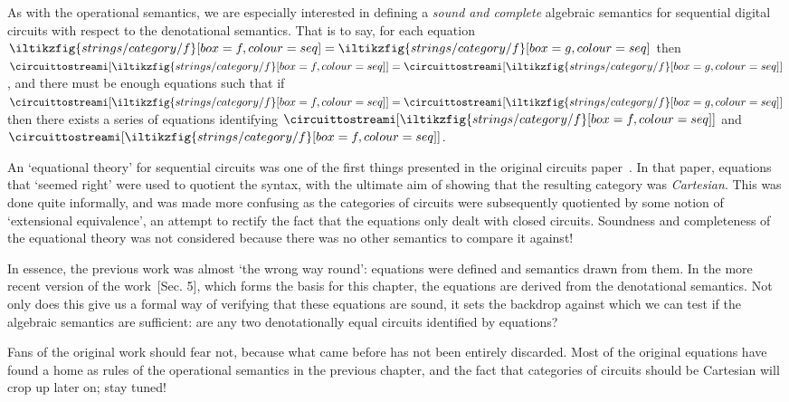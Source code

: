 As with the operational semantics, we are especially interested in defining a
\emph{sound and complete} algebraic semantics for sequential digital circuits
with respect to the denotational semantics.
That is to say, for each equation \(
    \iltikzfig{strings/category/f}[box=f,colour=seq]
    =
    \iltikzfig{strings/category/f}[box=g,colour=seq]
\) then \(
    \circuittostreami[\iltikzfig{strings/category/f}[box=f,colour=seq]]
    =
    \circuittostreami[\iltikzfig{strings/category/f}[box=g,colour=seq]]
\), and there must be enough equations such that if \(
    \circuittostreami[\iltikzfig{strings/category/f}[box=f,colour=seq]]
    =
    \circuittostreami[\iltikzfig{strings/category/f}[box=g,colour=seq]]
\) then there exists a series of equations identifying \(
    \circuittostreami[\iltikzfig{strings/category/f}[box=f,colour=seq]]
\) and \(
    \circuittostreami[\iltikzfig{strings/category/f}[box=f,colour=seq]]
\).

\begin{remark}
    An `equational theory' for sequential circuits was one of the first things
    presented in the original circuits
    paper~\cite{ghica2016categorical,ghica2017diagrammatic}.
    In that paper, equations that `seemed right' were used to quotient the
    syntax, with the ultimate aim of showing that the resulting category was
    \emph{Cartesian}.
    This was done quite informally, and was made more confusing as
    the categories of circuits were subsequently quotiented by some notion of
    `extensional equivalence', an attempt to rectify the fact that the
    equations only dealt with closed circuits.
    Soundness and completeness of the equational theory was not considered
    because there was no other semantics to compare it against!

    In essence, the previous work was almost `the wrong way round': equations
    were defined and semantics drawn from them.
    In the more recent version of the work~\cite{ghica2024fully}[Sec. 5], which
    forms the basis for this chapter, the equations are derived from the
    denotational semantics.
    Not only does this give us a formal way of verifying that these equations
    are sound, it sets the backdrop against which we can test if the algebraic
    semantics are sufficient: are any two denotationally equal circuits
    identified by equations?

    Fans of the original work should fear not, because what came before has not
    been entirely discarded.
    Most of the original equations have found a home as rules of the operational
    semantics in the previous chapter, and the fact that categories of circuits
    should be Cartesian will crop up later on; stay tuned!
\end{remark}




